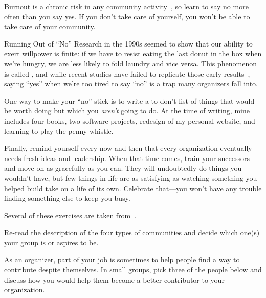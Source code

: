 
Burnout is a chronic risk in any community activity~\cite{Pign2016},
so learn to say no more often than you say yes.
If you don't take care of yourself,
you won't be able to take care of your community.

\begin{aside}{Running Out of ``No''}
  Research in the 1990s seemed to show that our ability to exert willpower is finite:
  if we have to resist eating the last donut in the box when we're hungry,
  we are less likely to fold laundry and vice versa.
  This phenomenon is called ,
  and while recent studies have failed to replicate those early results~\cite{Hagg2016},
  saying ``yes'' when we're too tired to say ``no''
  is a trap many organizers fall into.
\end{aside}

One way to make your ``no'' stick
is to write a to-don't list of things that would be worth doing
but which you \emph{aren't} going to do.
At the time of writing,
mine includes four books,
two software projects,
redesign of my personal website,
and learning to play the penny whistle.

Finally,
remind yourself every now and then that
every organization eventually needs fresh ideas and leadership.
When that time comes,
train your successors and move on as gracefully as you can.
They will undoubtedly do things you wouldn't have,
but few things in life are as satisfying as
watching something you helped build take on a life of its own.
Celebrate that---you won't have any trouble finding something else to keep you busy.


Several of these exercises are taken from~\cite{Brow2007}.


Re-read the description of the four types of communities
and decide which one(s) your group is or aspires to be.


As an organizer,
part of your job is sometimes to help people find a way to contribute despite themselves.
In small groups,
pick three of the people below
and discuss how you would help them become a better contributor to your organization.

